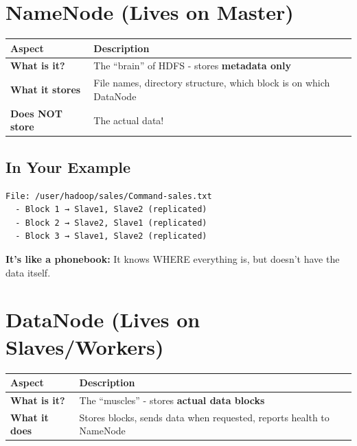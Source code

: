 \documentclass[12pt,a4paper]{article}
\begin{document}
\section{NameNode (Lives on Master)}

\begin{table}[h]
\centering
\renewcommand{\arraystretch}{1.4}
\begin{tabular}{>{\bfseries}l p{10cm}}
\toprule
Aspect & Description \\
\midrule
What is it? & The ``brain'' of HDFS - stores \textbf{metadata only} \\
What it stores & File names, directory structure, which block is on which DataNode \\
Does NOT store & The actual data! \\
\bottomrule
\end{tabular}
\end{table}

\subsection{In Your Example}

\begin{tcolorbox}[colback=codebackground, colframe=gray, title=NameNode's Memory]
\begin{verbatim}
File: /user/hadoop/sales/Command-sales.txt
  - Block 1 → Slave1, Slave2 (replicated)
  - Block 2 → Slave2, Slave1 (replicated)
  - Block 3 → Slave1, Slave2 (replicated)
\end{verbatim}
\end{tcolorbox}

\begin{infobox}[Analogy]
\textbf{It's like a phonebook:} It knows WHERE everything is, but doesn't have the data itself.
\end{infobox}

\section{DataNode (Lives on Slaves/Workers)}

\begin{table}[h]
\centering
\renewcommand{\arraystretch}{1.4}
\begin{tabular}{>{\bfseries}l p{10cm}}
\toprule
Aspect & Description \\
\midrule
What is it? & The ``muscles'' - stores \textbf{actual data blocks} \\
What it does & Stores blocks, sends data when requested, reports health to NameNode \\
\bottomrule
\end{tabular}
\end{table}
\end{document}
